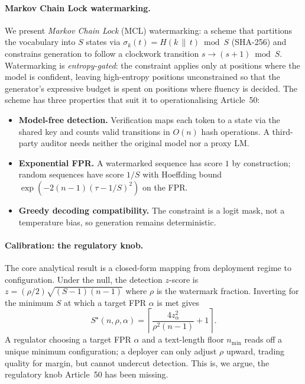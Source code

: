 \paragraph{Markov Chain Lock watermarking.}
We present \emph{Markov Chain Lock} (MCL) watermarking: a scheme
that partitions the vocabulary into $S$ states via
$\sigma_k(t) = H(k \,\|\, t) \bmod S$ (SHA-256) and constrains
generation to follow a clockwork transition $s \to (s+1) \bmod S$.
Watermarking is \emph{entropy-gated}: the constraint applies only at
positions where the model is confident, leaving high-entropy positions
unconstrained so that the generator's expressive budget is spent on
positions where fluency is decided. The scheme has three properties
that suit it to operationalising Article~50:
\begin{itemize}[nosep, leftmargin=*]
  \item \textbf{Model-free detection.} Verification maps each token to
    a state via the shared key and counts valid transitions in $O(n)$
    hash operations. A third-party auditor needs neither the original
    model nor a proxy LM.
  \item \textbf{Exponential FPR.} A watermarked sequence has score
    $1$ by construction; random sequences have score $1/S$ with
    Hoeffding bound $\exp(-2(n-1)(\tau - 1/S)^2)$ on the FPR.
  \item \textbf{Greedy decoding compatibility.} The constraint is a
    logit mask, not a temperature bias, so generation remains
    deterministic.
\end{itemize}

\paragraph{Calibration: the regulatory knob.}
The core analytical result is a closed-form mapping from deployment
regime to configuration. Under the null, the detection $z$-score is
$z = (\rho/2)\sqrt{(S-1)(n-1)}$ where $\rho$ is the watermark
fraction. Inverting for the minimum $S$ at which a target FPR $\alpha$
is met gives
\begin{equation}
  S^\star(n, \rho, \alpha)
    = \left\lceil \frac{4 z_\alpha^2}{\rho^2 (n-1)} + 1 \right\rceil.
  \label{eq:calibration-intro}
\end{equation}
A regulator choosing a target FPR $\alpha$ and a text-length floor
$n_{\min}$ reads off a unique minimum configuration; a deployer can
only adjust $\rho$ upward, trading quality for margin, but cannot
undercut detection. This is, we argue, the regulatory knob Article~50
has been missing.

